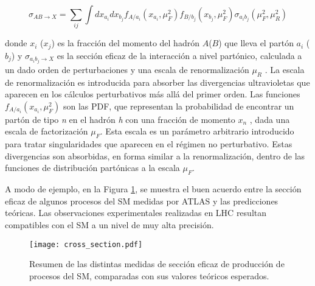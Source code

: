 \begin{equation}
\sigma_{AB\rightarrow X}=\sum_{ij}\int dx_{a_{i}}dx_{b_{j}}f_{A/a_{i}}(x_{a_{i}},\mu_{F}^{2})f_{B/b_{j}}(x_{b_{j}},\mu_{F}^{2})\sigma_{a_{i}b_{j}}(\mu_{F}^{2},\mu_{R}^{2})
\end{equation}

donde $x_{i}$ ($x_{j}$) es la fracción del momento del hadrón $A$($B$) que lleva el partón $a_{i}$ ($b_{j}$) y $\sigma_{a_{i}b_{j}\rightarrow X}$ es la sección eficaz de la interacción a nivel partónico, calculada a un dado orden de perturbaciones y una escala de renormalización $\mu_R$ . La escala de renormalización es introducida para absorber las divergencias ultravioletas que aparecen en los cálculos perturbativos más allá del primer orden. Las funciones $f_{A/a_{i}}(x_{a_{i}},\mu_{F}^{2})$ son las PDF, que representan la probabilidad de encontrar un partón de tipo \textit{n} en el hadrón \textit{h} con una fracción de momento $x_{n}$ , dada una escala de factorización $\mu_{F}$. Esta escala es un parámetro arbitrario introducido para tratar singularidades que aparecen en el régimen no perturbativo. Estas divergencias son absorbidas, en forma similar a la renormalización, dentro de las funciones de distribución partónicas a la escala $\mu_{F}$. 


A modo de ejemplo, en la Figura \ref{cross_section}, se muestra el buen acuerdo entre la sección eficaz de algunos procesos del SM medidas por ATLAS y las predicciones teóricas. Las observaciones experimentales realizadas en LHC resultan compatibles con el SM a un nivel de muy alta precisión.


\begin{figure}[ht]
\centering
\texttt{[image: cross\_section.pdf]}
\caption{Resumen de las distintas medidas de sección eficaz de producción de procesos del SM, comparadas con sus valores teóricos esperados.}
\label{cross_section}
\end{figure}
